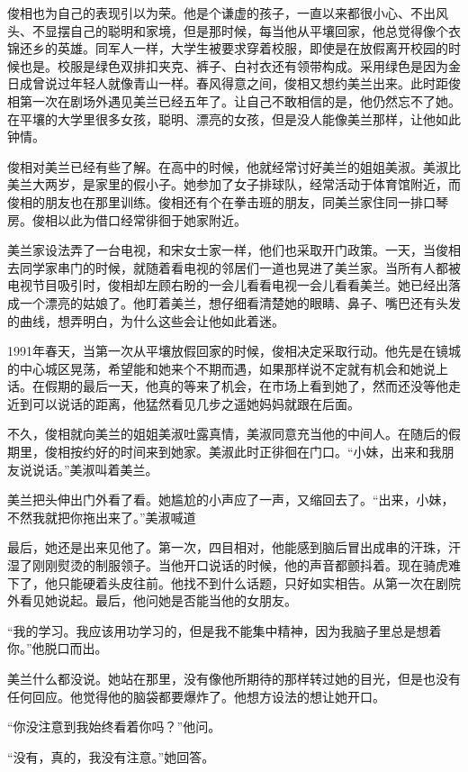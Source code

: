 俊相也为自己的表现引以为荣。他是个谦虚的孩子，一直以来都很小心、不出风头、不显摆自己的聪明和家境，但是那时候，每当他从平壤回家，他总觉得像个衣锦还乡的英雄。同军人一样，大学生被要求穿着校服，即使是在放假离开校园的时候也是。校服是绿色双排扣夹克、裤子、白衬衣还有领带构成。采用绿色是因为金日成曾说过年轻人就像青山一样。春风得意之间，俊相又想约美兰出来。此时距俊相第一次在剧场外遇见美兰已经五年了。让自己不敢相信的是，他仍然忘不了她。在平壤的大学里很多女孩，聪明、漂亮的女孩，但是没人能像美兰那样，让他如此钟情。

俊相对美兰已经有些了解。在高中的时候，他就经常讨好美兰的姐姐美淑。美淑比美兰大两岁，是家里的假小子。她参加了女子排球队，经常活动于体育馆附近，而俊相的朋友也在那里训练。俊相还有个在拳击班的朋友，同美兰家住同一排口琴房。俊相以此为借口经常徘徊于她家附近。

美兰家设法弄了一台电视，和宋女士家一样，他们也采取开门政策。一天，当俊相去同学家串门的时候，就随着看电视的邻居们一道也晃进了美兰家。当所有人都被电视节目吸引时，俊相却左顾右盼的一会儿看看电视一会儿看看美兰。她已经出落成一个漂亮的姑娘了。他盯着美兰，想仔细看清楚她的眼睛、鼻子、嘴巴还有头发的曲线，想弄明白，为什么这些会让他如此着迷。

1991年春天，当第一次从平壤放假回家的时候，俊相决定采取行动。他先是在镜城的中心城区晃荡，希望能和她来个不期而遇，如果那样说不定就有机会和她说上话。在假期的最后一天，他真的等来了机会，在市场上看到她了，然而还没等他走近到可以说话的距离，他猛然看见几步之遥她妈妈就跟在后面。

不久，俊相就向美兰的姐姐美淑吐露真情，美淑同意充当他的中间人。在随后的假期里，俊相按约好的时间来到她家。美淑此时正徘徊在门口。“小妹，出来和我朋友说说话。”美淑叫着美兰。

美兰把头伸出门外看了看。她尴尬的小声应了一声，又缩回去了。“出来，小妹，不然我就把你拖出来了。”美淑喊道

最后，她还是出来见他了。第一次，四目相对，他能感到脑后冒出成串的汗珠，汗湿了刚刚熨烫的制服领子。当他开口说话的时候，他的声音都颤抖着。现在骑虎难下了，他只能硬着头皮往前。他找不到什么话题，只好如实相告。从第一次在剧院外看见她说起。最后，他问她是否能当他的女朋友。

“我的学习。我应该用功学习的，但是我不能集中精神，因为我脑子里总是想着你。”他脱口而出。

美兰什么都没说。她站在那里，没有像他所期待的那样转过她的目光，但是也没有任何回应。他觉得他的脑袋都要爆炸了。他想方设法的想让她开口。

“你没注意到我始终看着你吗？”他问。

“没有，真的，我没有注意。”她回答。

